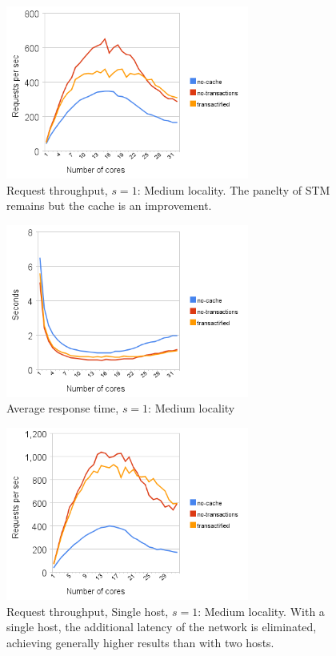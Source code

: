 \documentclass[preprint,natbib,11pt]{sigplanconf}
\begin{document}
\begin{figure}
 \begin{center}
  \includegraphics[width=8cm]{transaction-rate-client-server-1.png}
 \end{center}
 \caption{Request throughput, $s = 1$: Medium locality.
          The panelty of STM remains but the cache is an improvement.}
 \label{fig:request-throughput-1}
\end{figure}
\begin{figure}
 \begin{center}
  \includegraphics[width=8cm]{response-time-client-server-1.png}
 \end{center}
 \caption{Average response time, $s = 1$: Medium locality}
 \label{fig:response-time-1}
\end{figure}
\begin{figure}
 \begin{center}
  \includegraphics[width=8cm]{transaction-rate-single-host-1.png}
 \end{center}
 \caption{Request throughput, Single host, $s = 1$: Medium locality.
          With a single host, the additional latency of the network is
          eliminated, achieving generally higher results than with two hosts. }
 \label{fig:request-throughput-single-host-1}
\end{figure}
\end{document}
